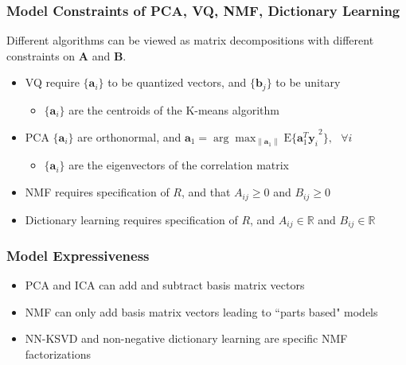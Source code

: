 \documentclass{beamer}
\begin{document}
\begin{frame}
\frametitle{Model Constraints of PCA, VQ, NMF, Dictionary Learning}

Different algorithms can be viewed as matrix decompositions with different constraints on \(\mathbf{A}\) and \(\mathbf{B}\).

\begin{itemize}
\item VQ require $\{\mathbf{a}_i\}$ to be quantized vectors, and $\{\mathbf{b}_{j}\}$ to be unitary 
    \begin{itemize}
        \item $\{\mathbf{a}_i\}$ are the centroids of the K-means algorithm
    \end{itemize}
\item PCA $\{\mathbf{a}_{i}\}$ are orthonormal, and $\mathbf{a}_{1} = \arg\max_{\|\mathbf{a}_{1}\|} { \text{E}\{{\mathbf{a}_1^T\mathbf{y}_i}^2\}, \ \ \  \forall{i}}$
    \begin{itemize}
        \item $\{\mathbf{a}_i\}$ are the eigenvectors of the correlation matrix
    \end{itemize}
\item NMF requires specification of $R$, and that $A_{ij} \ge 0$ and $B_{ij} \ge 0$
\item Dictionary learning requires specification of $R$, and $A_{ij} \in \mathbb{R}$ and $B_{ij} \in \mathbb{R}$
\end{itemize}
\end{frame}

\begin{frame}
\frametitle{Model Expressiveness}
\begin{itemize}
\item PCA and ICA can add and subtract basis matrix vectors
\item NMF can only add basis matrix vectors leading to ``parts based" models
\item NN-KSVD and non-negative dictionary learning are specific NMF factorizations
\end{itemize}
\end{frame}
\end{document}

